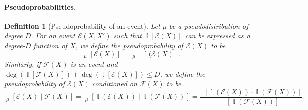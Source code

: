 \documentclass[11pt]{article}
\DeclareMathOperator*{\E}{\mathbb{E}}
\DeclareMathOperator*{\pE}{\widetilde{\mathbb{E}}}
\DeclareMathOperator*{\pPr}{\widetilde{\Pr}}
\DeclareMathOperator*{\Ind}{\mathbb{I}}
\def \R {\mathbb{R}}
\def \cE {\mathcal{E}}
\def \cF {\mathcal{F}}
\def \val {\mathrm{val}}
\newtheorem{definition}[theorem]{Definition}
\theoremstyle{definition}
\begin{document}


\paragraph{Pseudoprobabilities.}
\begin{definition}[Pseudoprobability of an event]\label{def:pseudoprob}
Let $\mu$ be a pseudodistribution of degree $D$.
For an event $\cE(X,X')$ such that $\Ind[\cE(X)]$ can be expressed as a degree-$D$ function of $X$, we define the {\em pseudoprobability of $\cE(X)$} to be
\[
\pPr_{\mu}[\cE(X)] = \pE_{\mu}[\Ind(\cE(X)].
\]
Similarly, if $\cF(X)$ is an event and $\deg(\Ind[\cF(X)]) + \deg(\Ind[\cE(X)]) \le D$,  we define the {\em pseudoprobability of $\cE(X)$ conditioned on $\cF(X)$} to be
\[
\pPr_\mu[\cE(X) \mid \cF(X)] = \pE_\mu[\Ind(\cE(X)) \mid \Ind(\cF(X))] = \frac{\pE[\Ind(\cE(X)) \cdot \Ind(\cF(X))]}{\pE[\Ind(\cF(X))]}.
\]
\end{definition}


\end{document}
